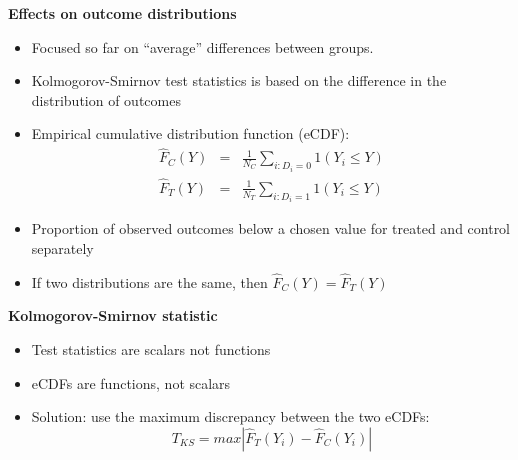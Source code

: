 \documentclass[notes=show]{beamer}
\begin{document}
\begin{frame}[plain]
\begin{center}
\textbf{Effects on outcome distributions}
\end{center}

\begin{itemize}
\item Focused so far on ``average'' differences between groups.
\item Kolmogorov-Smirnov test statistics is based on the difference in the distribution of outcomes 
\item Empirical cumulative distribution function (eCDF): 
\begin{eqnarray*}
\widehat{F}_C(Y) &=& \frac{1}{N_C} \sum_{i:D_i=0} 1(Y_i \leq Y) \\
\widehat{F}_T(Y)&=& \frac{1}{N_T} \sum_{i:D_i=1} 1(Y_i \leq Y)
\end{eqnarray*}
\item Proportion of observed outcomes below a chosen value for treated and control separately
\item If two distributions are the same, then $\widehat{F}_C(Y) = \widehat{F}_T(Y)$
\end{itemize}

\end{frame}


\begin{frame}[plain]
\begin{center}
\textbf{Kolmogorov-Smirnov statistic}
\end{center}

\begin{itemize}
\item Test statistics are scalars not functions
\item eCDFs are functions, not scalars
\item Solution: use the maximum discrepancy between the two eCDFs:$$T_{KS} = max | \widehat{F}_T(Y_i) - \widehat{F}_C(Y_i) |$$
\end{itemize}

\end{frame}
\end{document}
